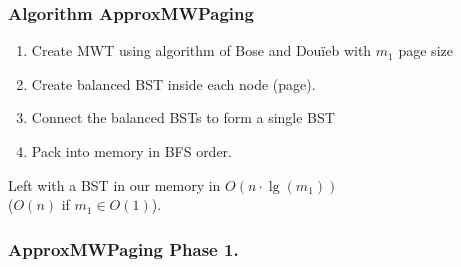 \documentclass{beamer}
\theoremstyle{plain}
\begin{document}
\begin{frame}[fragile] \frametitle{Algorithm ApproxMWPaging}\label{Algorithm ApproxMWPaging}

\begin{enumerate}
\item Create MWT using algorithm of Bose and Dou\"{i}eb with $m_1$ page size

\item Create balanced BST inside each node (page).

\item Connect the balanced BSTs to form a single BST

\item Pack into memory in BFS order.

\end{enumerate}

\noindent Left with a BST in our memory in $O(n\cdot\lg(m_1))$  \\
($O(n)$ if $m_1 \in O(1)$).

\end{frame}

\begin{frame} \frametitle{ApproxMWPaging Phase 1.}

\begin{tiny}
\begin{center}


\end{center}
\end{tiny}

\end{frame}
\end{document}
